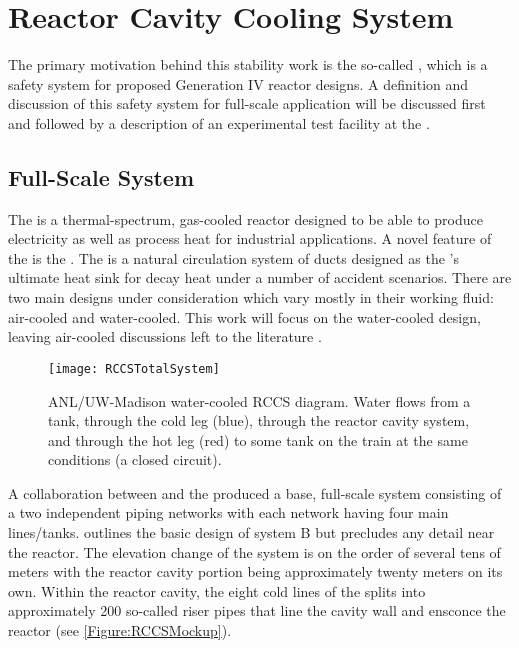 \section{Reactor Cavity Cooling System}\label{Section:RCCS}
The primary motivation behind this stability work is the so-called , which is a safety system for proposed Generation IV reactor designs.
A definition and discussion of this safety system for full-scale application will be discussed first and followed by a description of an experimental test facility at the \TheUniversity.

\subsection{Full-Scale System}
The  is a thermal-spectrum, gas-cooled reactor designed to be able to produce electricity as well as process heat for industrial applications.
A novel feature of the  is the .
The  is a natural circulation system of ducts designed as the 's ultimate heat sink for decay heat under a number of accident scenarios.
There are two main designs under consideration which vary mostly in their working fluid: air-cooled and water-cooled.
This work will focus on the water-cooled  design, leaving air-cooled discussions left to the literature \cite{bechtel_national_inc._450_1993,general_atomics_gas_1996}.
\begin{figure}%
\centering
    \caption[ANL/UW-Madison water-cooled RCCS diagram]{   ANL/UW-Madison  water-cooled RCCS diagram.  
                Water flows from a tank, through the cold leg (blue), through the reactor cavity system, and through the hot leg (red) to some tank on the train at the same conditions (a closed circuit).}%
    \label{Figure:RCCSTotalSystem}%
    \texttt{[image: RCCSTotalSystem]}%
\end{figure}
A collaboration between  and the \TheUniversity produced a base, full-scale  system consisting of a two independent piping networks with each network having four main lines/tanks.
 outlines the basic design of system B but precludes any detail near the reactor.
The elevation change of the system is on the order of several tens of meters with the reactor cavity portion being approximately twenty meters on its own.
Within the reactor cavity, the eight cold lines of the  splits into approximately 200 so-called riser pipes that line the cavity wall and ensconce the reactor (see \cref{Figure:RCCSMockup}).
